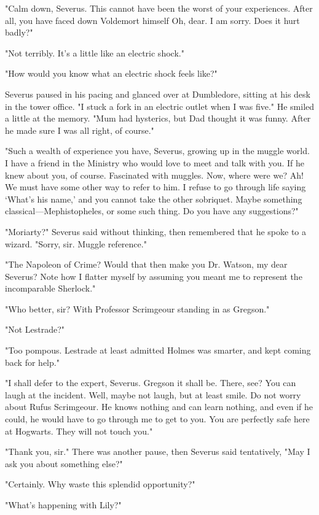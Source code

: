 "Calm down, Severus. This cannot have been the worst of your experiences. After all, you have faced down Voldemort himself{\el} Oh, dear. I am sorry. Does it hurt badly?"

"Not terribly. It's a little like an electric shock."

"How would you know what an electric shock feels like?"

Severus paused in his pacing and glanced over at Dumbledore, sitting at his desk in the tower office. "I stuck a fork in an electric outlet when I was five." He smiled a little at the memory. "Mum had hysterics, but Dad thought it was funny. After he made sure I was all right, of course."

"Such a wealth of experience you have, Severus, growing up in the muggle world. I have a friend in the Ministry who would love to meet and talk with you. If he knew about you, of course. Fascinated with muggles. Now, where were we? Ah! We must have some other way to refer to{\el} him. I refuse to go through life saying `What's his name,' and you cannot take the other sobriquet. Maybe something classical—Mephistopheles, or some such thing. Do you have any suggestions?"

"Moriarty?" Severus said without thinking, then remembered that he spoke to a wizard. "Sorry, sir. Muggle reference."

"The Napoleon of Crime? Would that then make you Dr. Watson, my dear Severus? Note how I flatter myself by assuming you meant me to represent the incomparable Sherlock."

"Who better, sir? With Professor Scrimgeour standing in as Gregson."

"Not Lestrade?"

"Too pompous. Lestrade at least admitted Holmes was smarter, and kept coming back for help."

"I shall defer to the expert, Severus. Gregson it shall be. There, see? You can laugh at the incident. Well, maybe not laugh, but at least smile. Do not worry about Rufus Scrimgeour. He knows nothing and can learn nothing, and even if he could, he would have to go through me to get to you. You are perfectly safe here at Hogwarts. They will not touch you."

"Thank you, sir." There was another pause, then Severus said tentatively, "May I ask you about something else?"

"Certainly. Why waste this splendid opportunity?"

"What's happening with Lily?"

